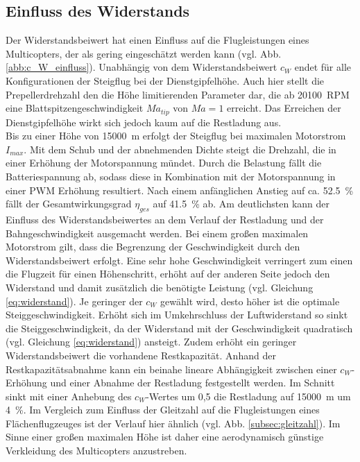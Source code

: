 \subsection{Einfluss des Widerstands}
\label{subsec:widerstandseinfluss}
Der Widerstandsbeiwert hat einen Einfluss auf die Flugleistungen eines Multicopters, der als gering eingeschätzt werden kann (vgl. Abb. \ref{abb:c_W_einfluss}). Unabhängig von dem Widerstandsbeiwert \ensuremath{c_W} endet für alle Konfigurationen der Steigflug bei der Dienstgipfelhöhe. Auch hier stellt die Prepellerdrehzahl den die Höhe limitierenden Parameter dar, die ab \SI{20100}{RPM} eine Blattspitzengeschwindigkeit \ensuremath{Ma_{tip}} von \ensuremath{Ma = 1} erreicht. Das Erreichen der Dienstgipfelhöhe wirkt sich jedoch kaum auf die Restladung aus.\\
Bis zu einer Höhe von \SI{15000}{m} erfolgt der Steigflug bei maximalen Motorstrom \ensuremath{I_{max}}. Mit dem Schub und der abnehmenden Dichte steigt die Drehzahl, die in einer Erhöhung der Motorspannung mündet. Durch die Belastung fällt die Batteriespannung ab, sodass diese in Kombination mit der Motorspannung in einer PWM Erhöhung resultiert. Nach einem anfänglichen Anstieg auf ca. \SI{52,5}{\%} fällt der Gesamtwirkungsgrad \ensuremath{\eta_{ges}} auf \SI{41,5}{\%} ab. 
Am deutlichsten kann der Einfluss des Widerstandsbeiwertes an dem Verlauf der Restladung und der Bahngeschwindigkeit ausgemacht werden. 
Bei einem großen maximalen Motorstrom gilt, dass die Begrenzung der Geschwindigkeit durch den Widerstandsbeiwert erfolgt. Eine sehr hohe Geschwindigkeit verringert zum einen die Flugzeit für einen Höhenschritt, erhöht auf der anderen Seite jedoch den Widerstand und damit zusätzlich die benötigte Leistung (vgl. Gleichung \eqref{eq:widerstand}). Je geringer der \ensuremath{c_W} gewählt wird, desto höher ist die optimale Steiggeschwindigkeit. Erhöht sich im Umkehrschluss der Luftwiderstand so sinkt die Steiggeschwindigkeit, da der Widerstand mit der Geschwindigkeit quadratisch (vgl. Gleichung \eqref{eq:widerstand}) ansteigt. Zudem erhöht ein geringer Widerstandsbeiwert die vorhandene Restkapazität. Anhand der Restkapazitätsabnahme kann ein beinahe lineare Abhängigkeit zwischen einer \ensuremath{c_W}-Erhöhung und einer Abnahme der Restladung festgestellt werden. Im Schnitt sinkt mit einer Anhebung des \ensuremath{c_W}-Wertes um 0,5 die Restladung auf \SI{15000}{m} um \SI{4}{\%}. Im Vergleich zum Einfluss der Gleitzahl auf die Flugleistungen eines Flächenflugzeuges ist der Verlauf hier ähnlich (vgl. Abb. \ref{subsec:gleitzahl}). 
Im Sinne einer großen maximalen Höhe ist daher eine aerodynamisch günstige Verkleidung des Multicopters anzustreben.
  
